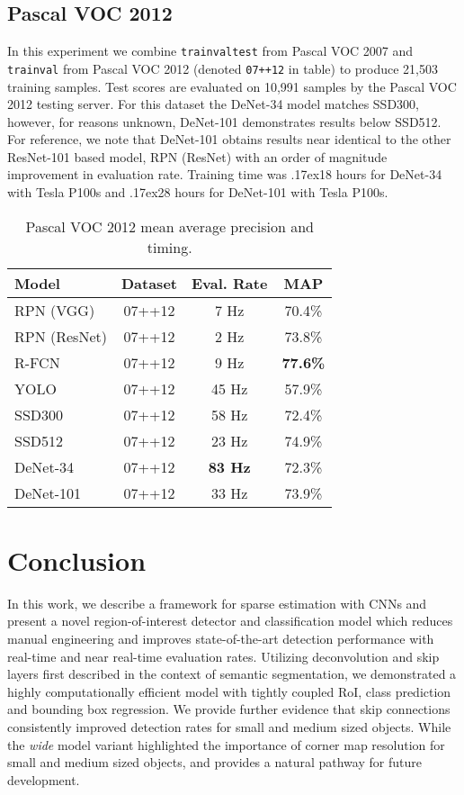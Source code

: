\documentclass[10pt,twocolumn]{article}
\newcommand\approxtilde{\raise.17ex\hbox{}}
\begin{document}
\subsection{Pascal VOC 2012}
In this experiment we combine \texttt{trainvaltest} from Pascal VOC 2007 and \texttt{trainval} from Pascal VOC 2012 \cite{pascal-voc} (denoted \texttt{07++12} in table) to produce 21,503 training samples. Test scores are evaluated on 10,991 samples by the Pascal VOC 2012 testing server. For this dataset the DeNet-34 model matches SSD300, however, for reasons unknown, DeNet-101 demonstrates results below SSD512. For reference, we note that DeNet-101 obtains results near identical to the other ResNet-101 based model, RPN (ResNet) with an order of magnitude improvement in evaluation rate. Training time was \approxtilde 18 hours for DeNet-34 with  Tesla P100s and \approxtilde 28 hours for DeNet-101  with  Tesla P100s.

\begin{table}[tb]
\begin{center}
\begin{tabular}{l|c|c|c}
 Model & Dataset & Eval. Rate & MAP \\
\hline
\rowcolor[gray]{.85} RPN (VGG) & 07++12 & 7 Hz & 70.4\% \\
\rowcolor[gray]{.85} RPN (ResNet) & 07++12  & 2 Hz &  73.8\%\\
\rowcolor[gray]{.85} R-FCN & 07++12 & 9 Hz & \textbf{77.6\%} \\
YOLO & 07++12  & 45 Hz & 57.9\% \\
SSD300 & 07++12  & 58 Hz & 72.4\% \\
SSD512 & 07++12  & 23 Hz & 74.9\% \\
\hline
DeNet-34 & 07++12 &  \textbf{83 Hz} & 72.3\% \\
DeNet-101 & 07++12 & 33 Hz & 73.9\% 
\end{tabular}
\end{center}
\caption{Pascal VOC 2012 mean average precision and timing. }
\label{table:voc2012}
\end{table}

\section{Conclusion}
In this work, we describe a framework for sparse estimation with CNNs and present a novel region-of-interest detector and classification model which reduces manual engineering and improves state-of-the-art detection performance with real-time and near real-time evaluation rates. Utilizing deconvolution and skip layers first described in the context of semantic segmentation, we demonstrated a highly computationally efficient model with tightly coupled RoI, class prediction and bounding box regression. We provide further evidence that skip connections consistently improved detection rates for small and medium sized objects. While the \textit{wide} model variant highlighted the importance of corner map resolution for small and medium sized objects, and provides a natural pathway for future development. 
\end{document}
